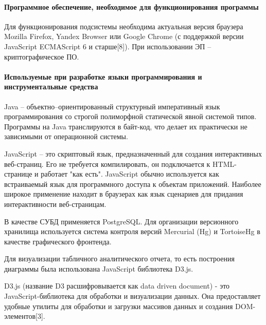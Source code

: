 \documentclass[a4paper]{extarticle}
\numberwithin{equation}{section}
\begin{document}
\paragraph{Программное обеспечение, необходимое для функционирования программы}
Для функционирования подсистемы необходима актуальная версия браузера Mozilla Firefox, Yandex Browser или Google Chrome (с поддержкой версии JavaScript ECMAScript 6 и старше[8]). При использовании ЭП – криптографическое ПО.

\paragraph{Используемые при разработке языки программирования и инструментальные средства}
Java – объектно–ориентированный структурный императивный язык программирования со строгой полиморфной статической явной системой типов. Программы на Java транслируются в байт-код, что делает их практически не зависимыми от операционной системы.\par
JavaScript – это скриптовый язык, предназначенный для создания интерактивных веб-страниц. Его не требуется компилировать, он подключается к HTML-странице и работает "как есть". JavaScript обычно используется как встраиваемый язык для программного доступа к объектам приложений. Наиболее широкое применение находит в браузерах как язык сценариев для придания интерактивности веб-страницам.\par
В качестве СУБД применяется PostgreSQL. Для организации версионного хранилища используется система контроля версий Mercurial (Hg) и TortoiseHg в качестве графического фронтенда.\par
Для визуализации табличного аналитического отчета, то есть построения диаграммы была использована JavaScript библиотека D3.js.\par
D3.js (название D3 расшифровывается как data driven document) - это JavaScript-библиотека для обработки и визуализации данных. Она предоставляет удобные утилиты для обработки и загрузки массивов данных и создания DOM-элементов[3].
\end{document}
